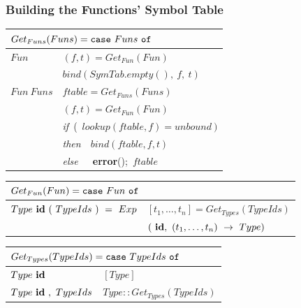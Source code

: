 \documentclass{beamer}
\begin{document}
\begin{frame}
\frametitle{Building the Functions' Symbol Table}

\bigskip

\renewcommand{\arraystretch}{0.9}
\begin{tabular}{|l|l|}\hline
\multicolumn{2}{|l|}{$Get_{Funs}(Funs)
 = \mbox{\tt case}~Funs~\mbox{\tt of} $} \\\hline

$Fun$   & $(f,t) = Get_{Fun}(Fun)$ \\ 
        & $bind(SymTab.empty (),~f,~t)$ \\\hline

$Fun~Funs$
        & $ftable = Get_{Funs}(Funs)$ \\
        & $(f,t) = Get_{Fun}(Fun)$ \\
        & {\em if}~(~$lookup(ftable,f) = unbound~)$ \\
        & {\em then}~~$bind(ftable,f,t)$ \\
        & {\em else}~~~\alert{{\bf error}}();~$ftable$ \\\hline
\end{tabular}

\bigskip

\begin{tabular}{|l|l|}\hline
\multicolumn{2}{|l|}{$Get_{Fun}(Fun)
 = \mbox{\tt case}~Fun~\mbox{\tt of} $} \\\hline

$Type~\mbox{\textbf{id}}~(~TypeIds~)~=~Exp$
        & $ [t_1,\dots,t_n] = Get_{Types}(TypeIds)$ \\
        & $(~\mbox{\textbf{id}},~(t_1,\ldots,t_n)~\rightarrow~Type)$ \\\hline
\end{tabular}

\bigskip

\begin{tabular}{|l|l|}\hline
\multicolumn{2}{|l|}{$Get_{Types}(TypeIds)
 = \mbox{\tt case}~TypeIds~\mbox{\tt of} $} \\\hline

$Type~\mbox{\textbf{id}}$
        & $[Type]$  \\\hline
$Type~\mbox{\textbf{id}}~,~TypeIds$
        & $Type::Get_{Types}(TypeIds)$\\\hline
\end{tabular}

\end{frame}


\end{document}
